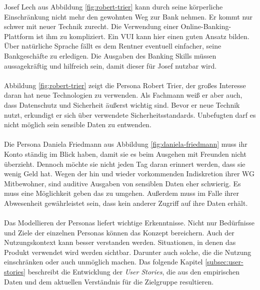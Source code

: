 Josef Lech aus Abbildung \ref{fig:robert-trier} kann durch seine körperliche Einschränkung nicht mehr den gewohnten Weg zur Bank nehmen. Er kommt nur schwer mit neuer Technik zurecht. Die Verwendung einer Online-Banking-Plattform ist ihm zu kompliziert. Ein \ac{VUI} kann hier einen guten Ansatz bilden. Über natürliche Sprache fällt es dem Rentner eventuell einfacher, seine Bankgeschäfte zu erledigen. Die Ausgaben des Banking Skills müssen aussagekräftig und hilfreich sein, damit dieser für Josef nutzbar wird.\\\\
Abbildung \ref{fig:robert-trier} zeigt die Persona Robert Trier, der großes Interesse daran hat neue Technologien zu verwenden. Als Fachmann weiß er aber auch, dass Datenschutz und Sicherheit äußerst wichtig sind. Bevor er neue Technik nutzt, erkundigt er sich über verwendete Sicherheitsstandards. Unbefugten darf es nicht möglich sein sensible Daten zu entwenden.\\\\
Die Persona Daniela Friedmann aus Abbildung \ref{fig:daniela-friedmann} muss ihr Konto ständig im Blick haben, damit sie es beim Ausgehen mit Freunden nicht überzieht. Dennoch möchte sie nicht jeden Tag daran erinnert werden, dass sie wenig Geld hat. Wegen der hin und wieder vorkommenden Indiskretion ihrer WG Mitbewohner, sind auditive Ausgaben von sensiblen Daten eher schwierig. Es muss eine Möglichkeit geben das zu umgehen. Außerdem muss im Falle ihrer Abwesenheit gewährleistet sein, dass kein anderer Zugriff auf ihre Daten erhält.\\\\
Das Modellieren der Personas liefert wichtige Erkenntnisse. Nicht nur Bedürfnisse und Ziele der einzelnen Personas können das Konzept bereichern. Auch der Nutzungskontext kann besser verstanden werden. Situationen, in denen das Produkt verwendet wird werden sichtbar. Darunter auch solche, die die Nutzung einschränken oder auch unmöglich machen. Das folgende Kapitel \ref{subsec:user-stories} beschreibt die Entwicklung der \textit{User Stories}, die aus den empirischen Daten und dem aktuellen Verständnis für die Zielgruppe resultieren.

